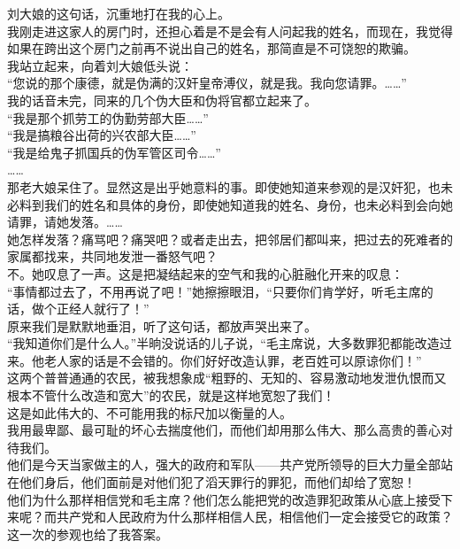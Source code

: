 刘大娘的这句话，沉重地打在我的心上。\\

我刚走进这家人的房门时，还担心着是不是会有人问起我的姓名，而现在，我觉得如果在跨出这个房门之前再不说出自己的姓名，那简直是不可饶恕的欺骗。\\

我站立起来，向着刘大娘低头说：\\

“您说的那个康德，就是伪满的汉奸皇帝溥仪，就是我。我向您请罪。……”\\

我的话音未完，同来的几个伪大臣和伪将官都立起来了。\\

“我是那个抓劳工的伪勤劳部大臣……”\\

“我是搞粮谷出荷的兴农部大臣……”\\

“我是给鬼子抓国兵的伪军管区司令……”\\

……\\

那老大娘呆住了。显然这是出乎她意料的事。即使她知道来参观的是汉奸犯，也未必料到我们的姓名和具体的身份，即使她知道我的姓名、身份，也未必料到会向她请罪，请她发落。……\\

她怎样发落？痛骂吧？痛哭吧？或者走出去，把邻居们都叫来，把过去的死难者的家属都找来，共同地发泄一番怒气吧？\\

不。她叹息了一声。这是把凝结起来的空气和我的心脏融化开来的叹息：\\

“事情都过去了，不用再说了吧！”她擦擦眼泪，“只要你们肯学好，听毛主席的话，做个正经人就行了！”\\

原来我们是默默地垂泪，听了这句话，都放声哭出来了。\\

“我知道你们是什么人。”半晌没说话的儿子说，“毛主席说，大多数罪犯都能改造过来。他老人家的话是不会错的。你们好好改造认罪，老百姓可以原谅你们！”\\

这两个普普通通的农民，被我想象成“粗野的、无知的、容易激动地发泄仇恨而又根本不管什么改造和宽大”的农民，就是这样地宽恕了我们！\\

这是如此伟大的、不可能用我的标尺加以衡量的人。\\

我用最卑鄙、最可耻的坏心去揣度他们，而他们却用那么伟大、那么高贵的善心对待我们。\\

他们是今天当家做主的人，强大的政府和军队——共产党所领导的巨大力量全部站在他们身后，他们面前是对他们犯了滔天罪行的罪犯，而他们却给了宽恕！\\

他们为什么那样相信党和毛主席？他们怎么能把党的改造罪犯政策从心底上接受下来呢？而共产党和人民政府为什么那样相信人民，相信他们一定会接受它的政策？\\

这一次的参观也给了我答案。\\